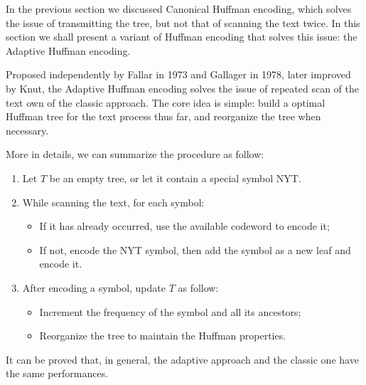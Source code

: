 \documentclass{subfiles}
\begin{document}
    In the previous section we discussed Canonical Huffman encoding, 
        which solves the issue of transmitting the tree, 
        but not that of scanning the text twice.
        In this section we shall present a variant of Huffman encoding that 
        solves this issue: the Adaptive Huffman encoding.

    Proposed independently by Fallar in 1973 and Gallager in 1978,
        later improved by Knut, the Adaptive Huffman encoding
        solves the issue of repeated scan of the text own of the classic approach.
        The core idea is simple: build a optimal Huffman tree for the text 
        process thus far, and reorganize the tree when necessary.

    More in details, we can summarize the procedure as follow:
    \begin{enumerate}
        \item Let \(T\) be an empty tree, or let it contain a special symbol 
            NYT.
        \item While scanning the text, for each symbol:
            \begin{itemize}
                \item If it has already occurred, use the available codeword to encode it;
                \item If not, encode the NYT symbol, then add the symbol as a new leaf and encode it.
            \end{itemize}
        \item After encoding a symbol, update \(T\) as follow:
                \begin{itemize}
                    \item Increment the frequency of the symbol and all its ancestors;
                    \item Reorganize the tree to maintain the Huffman properties.
                \end{itemize}
    \end{enumerate}

    It can be proved that, in general,
        the adaptive approach and the classic one have the same performances.
\end{document}
